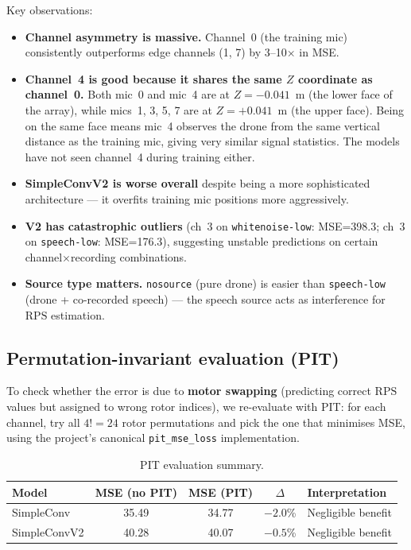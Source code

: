 \documentclass[11pt,a4paper]{article}
\newcommand{\rps}{\ensuremath{\mathrm{RPS}}}
\begin{document}
Key observations:
\begin{itemize}
  \item \textbf{Channel asymmetry is massive.} Channel~0 (the training mic) consistently
    outperforms edge channels (1, 7) by 3--10$\times$ in MSE.
  \item \textbf{Channel~4 is good because it shares the same $Z$ coordinate as channel~0.}
    Both mic~0 and mic~4 are at $Z = -0.041$~m (the lower face of the array), while
    mics~1, 3, 5, 7 are at $Z = +0.041$~m (the upper face). Being on the same face
    means mic~4 observes the drone from the same vertical distance as the training
    mic, giving very similar signal statistics. The models have not seen channel~4
    during training either.
  \item \textbf{SimpleConvV2 is worse overall} despite being a more sophisticated
    architecture --- it overfits training mic positions more aggressively.
  \item \textbf{V2 has catastrophic outliers} (ch~3 on \texttt{whitenoise-low}: MSE=398.3;
    ch~3 on \texttt{speech-low}: MSE=176.3), suggesting unstable predictions on
    certain channel$\times$recording combinations.
  \item \textbf{Source type matters.} \texttt{nosource} (pure drone) is easier than
    \texttt{speech-low} (drone + co-recorded speech) --- the speech source acts as
    interference for \rps{} estimation.
\end{itemize}

\subsection{Permutation-invariant evaluation (PIT)}

To check whether the error is due to \textbf{motor swapping} (predicting correct
\rps{} values but assigned to wrong rotor indices), we re-evaluate with PIT:
for each channel, try all $4! = 24$ rotor permutations and pick the one that
minimises MSE, using the project's canonical \texttt{pit\_mse\_loss} implementation.

\begin{table}[ht]
  \centering
  \caption{PIT evaluation summary.}
  \label{tab:pit}
  \small
  \begin{tabular}{lcccp{3.5cm}}
    \toprule
    Model & MSE (no PIT) & MSE (PIT) & $\Delta$ & Interpretation \\
    \midrule
    SimpleConv & 35.49 & 34.77 & $-2.0$\% & Negligible benefit \\
    SimpleConvV2 & 40.28 & 40.07 & $-0.5$\% & Negligible benefit \\
    \bottomrule
  \end{tabular}
\end{table}
\end{document}
